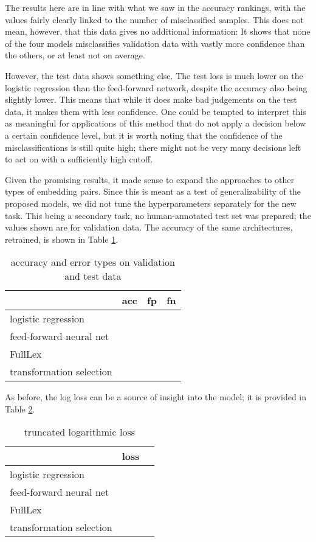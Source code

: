 \documentclass[a4paper, 11pt]{scrartcl}
\begin{document}
The results here are in line with what we saw in the accuracy rankings, with the values fairly clearly linked to the number of misclassified samples. This does not mean, however, that this data gives no additional information: It shows that none of the four models misclassifies validation data with vastly more confidence than the others, or at least not on average.

However, the test data shows something else. The test loss is much lower on the logistic regression than the feed-forward network, despite the accuracy also being slightly lower. This means that while it does make bad judgements on the test data, it makes them with less confidence. One could be tempted to interpret this as meaningful for applications of this method that do not apply a decision below a certain confidence level, but it is worth noting that the confidence of the misclassifications is still quite high; there might not be very many decisions left to act on with a sufficiently high cutoff.

Given the promising results, it made sense to expand the approaches to other types of embedding pairs. Since this is meant as a test of generalizability of the proposed models, we did not tune the hyperparameters separately for the new task. This being a secondary task, no human-annotated test set was prepared; the values shown are for validation data. The accuracy of the same architectures, retrained, is shown in Table \ref{accuracy-vn}.

\begin{table}[]
	\centering
	\begin{tabular}{l|lll}
		                         & acc      & fp       & fn        \\ \hline
		logistic regression      &          &          &           \\
		feed-forward neural net  &          &          &           \\
		FullLex                  &          &          &           \\
		transformation selection &          &          &
	\end{tabular}
	\caption{accuracy and error types on validation and test data}
	\label{accuracy-vn}
\end{table}

As before, the log loss can be a source of insight into the model; it is provided in Table \ref{loss-vn}.

\begin{table}[]
	\centering
	\begin{tabular}{l|l|l}
		                         & loss      \\ \hline
		logistic regression      &           \\
		feed-forward neural net  &           \\
		FullLex                  &           \\
		transformation selection &
	\end{tabular}
	\caption{truncated logarithmic loss}
	\label{loss-vn}
\end{table}
\end{document}
